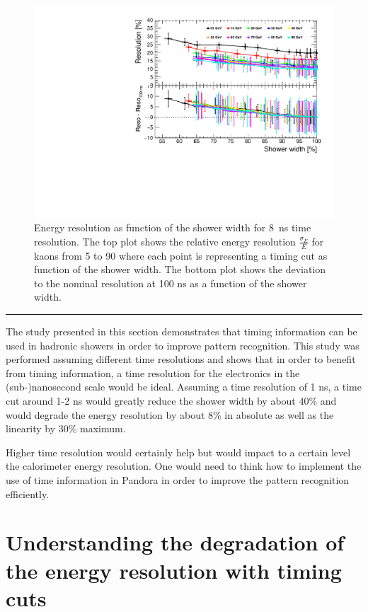 \begin{figure}[htbp!]
  \centering
  \includegraphics[width=0.7\linewidth]{../Thesis_Plots/ILD/Smearing_8ns/Plots/ShowerWidth_Resolution_Smearing3}
  \caption{Energy resolution as function of the shower width for \SI{8}{\nano\second} time resolution. The top plot shows the relative energy resolution $\frac{\sigma_{E}}{E}$ for kaons from 5 to 90 \GeV where each point is representing a timing cut as function of the shower width. The bottom plot shows the deviation to the nominal resolution at 100 ns as a function of the shower width.}  \label{fig:WidthReso8ns}
\end{figure}

\begin{center}
  \rule{0.5\textwidth}{.4pt}
\end{center}

The study presented in this section demonstrates that timing information can be used in hadronic showers in order to improve pattern recognition. This study was performed assuming different time resolutions and shows that in order to benefit from timing information, a time resolution for the electronics in the (sub-)nanosecond scale would be ideal. Assuming a time resolution of 1 ns, a time cut around 1-2 ns would greatly reduce the shower width by about 40\% and would degrade the energy resolution by about 8\% in absolute as well as the linearity by 30\% maximum.

Higher time resolution would certainly help but would impact to a certain level the calorimeter energy resolution. One would need to think how to implement the use of time information in Pandora in order to improve the pattern recognition efficiently.

\section{Understanding the degradation of the energy resolution with timing cuts}
\label{sec:eresdegrad}


